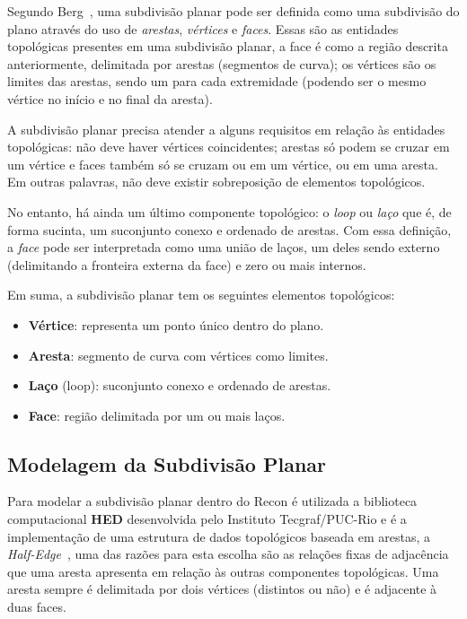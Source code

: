 Segundo Berg~\cite{Berg}, uma subdivisão planar pode ser definida como uma subdivisão do plano através do uso de \textit{arestas}, \textit{vértices} e \textit{faces}. Essas são as entidades topológicas presentes em uma subdivisão planar, a face é como a região descrita anteriormente, delimitada por arestas (segmentos de curva); os vértices são os limites das arestas, sendo um para cada extremidade (podendo ser o mesmo vértice no início e no final da aresta).

A subdivisão planar precisa atender a alguns requisitos em relação às entidades topológicas: não deve haver vértices coincidentes; arestas só podem se cruzar em um vértice e faces também só se cruzam ou em um vértice, ou em uma aresta. Em outras palavras, não deve existir sobreposição de elementos topológicos. 

No entanto, há ainda um último componente topológico: o \textit{loop} ou \textit{laço} que é, de forma sucinta, um suconjunto conexo e ordenado de arestas. Com essa definição, a \textit{face} pode ser interpretada como uma união de laços, um deles sendo externo (delimitando a fronteira externa da face) e zero ou mais internos.

Em suma, a subdivisão planar tem os seguintes elementos topológicos:
\renewcommand{\labelitemi}{•}
\begin{itemize}
  \item \textbf{Vértice}: representa um ponto único dentro do plano.
  \item \textbf{Aresta}: segmento de curva com vértices como limites.
  \item \textbf{Laço} (loop): suconjunto conexo e ordenado de arestas.
  \item \textbf{Face}: região delimitada por um ou mais laços.
\end{itemize}

\subsection{Modelagem da Subdivisão Planar}

Para modelar a subdivisão planar dentro do Recon é utilizada a biblioteca computacional \textbf{HED} desenvolvida pelo Instituto Tecgraf/PUC-Rio e é a implementação de uma estrutura de dados topológicos baseada em arestas, a \textit{Half-Edge}~\cite{HED}, uma das razões para esta escolha são as relações fixas de adjacência que uma aresta apresenta em relação às outras componentes topológicas. Uma aresta sempre é delimitada por dois vértices (distintos ou não) e é adjacente à duas faces.

